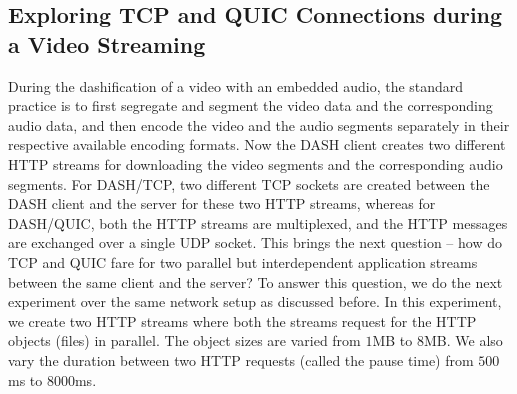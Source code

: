 \subsection{Exploring TCP and QUIC Connections during a Video Streaming}
During the dashification of a video with an embedded audio, the standard practice is to first segregate and segment the video data and the corresponding audio data, and then encode the video and the audio segments separately in their respective available encoding formats. 
Now the DASH client creates two different HTTP streams for downloading the video segments and the corresponding audio segments. For DASH/TCP, two different TCP sockets are created between the DASH client and the server for these two HTTP streams, whereas for DASH/QUIC, both the HTTP streams are multiplexed, and the HTTP messages are exchanged over a single UDP socket. 
This brings the next question -- how do TCP and QUIC fare for two parallel but interdependent application streams between the same client and the server?  To answer this question, we do the next experiment over the same network setup as discussed before. In this experiment, we create two HTTP streams where both the streams request for the HTTP objects (files) in parallel. The object sizes are varied from $1$MB to $8$MB. 
We also vary the duration between two HTTP requests (called the pause time) from $500$ms to $8000$ms. 



